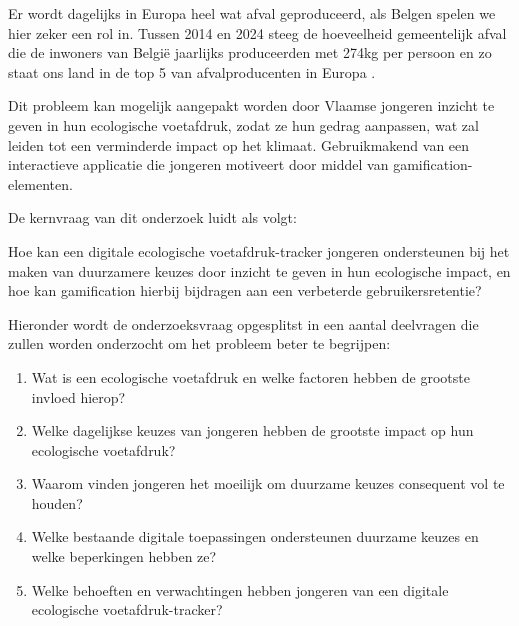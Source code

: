 \documentclass{hogent-article}
\begin{document}
    Er wordt dagelijks in Europa heel wat afval geproduceerd, als Belgen spelen we hier zeker een rol in. Tussen 2014 en 2024 steeg de hoeveelheid gemeentelijk afval die de inwoners van België jaarlijks produceerden met 274kg per persoon \autocite{Eurostat2026} en zo staat ons land in de top 5 van afvalproducenten in Europa \autocite{Eurostat2026}.

    Dit probleem kan mogelijk aangepakt worden door Vlaamse jongeren inzicht te geven in hun ecologische voetafdruk, zodat ze hun gedrag aanpassen, wat zal leiden tot een verminderde impact op het klimaat. Gebruikmakend van een interactieve applicatie die jongeren motiveert door middel van gamification-elementen. 
    
    De kernvraag van dit onderzoek luidt als volgt:
    \begin{tcolorbox}[colback=yellow!10]
        Hoe kan een digitale ecologische voetafdruk-tracker jongeren ondersteunen bij het maken van duurzamere keuzes door inzicht te geven in hun ecologische impact, en hoe kan gamification hierbij bijdragen aan een verbeterde gebruikersretentie?
    \end{tcolorbox}
    
    Hieronder wordt de onderzoeksvraag opgesplitst in een aantal deelvragen die zullen worden onderzocht om het probleem beter te begrijpen:
    
    \begin{enumerate}
        \item Wat is een ecologische voetafdruk en welke factoren hebben de grootste invloed hierop? 
        \item Welke dagelijkse keuzes van jongeren hebben de grootste impact op hun ecologische voetafdruk?
        \item Waarom vinden jongeren het moeilijk om duurzame keuzes consequent vol te houden?
        \item Welke bestaande digitale toepassingen ondersteunen duurzame keuzes en welke beperkingen hebben ze?
        \item Welke behoeften en verwachtingen hebben jongeren van een digitale ecologische voet\-afdruk\--tracker?
    \end{enumerate}
    
\end{document}
